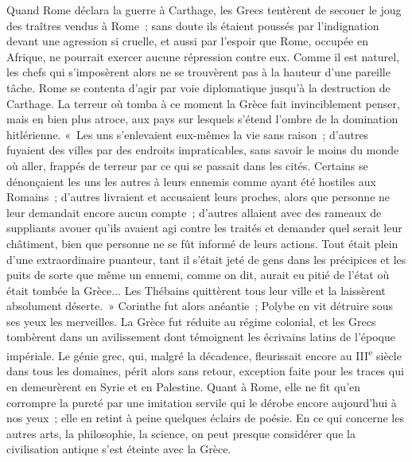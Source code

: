 \documentclass[french,twoside]{book} %
\begin{document}
Quand Rome déclara la guerre à Carthage, les Grecs tentèrent de secouer le joug des traîtres vendus à Rome ; sans doute ils étaient poussés par l'indi­gnation devant une agression si cruelle, et aussi par l'espoir que Rome, occupée en Afrique, ne pourrait exercer aucune répression contre eux. Comme il est naturel, les chefs qui s'imposèrent alors ne se trouvèrent pas à la hauteur d'une pareille tâche. Rome se contenta d'agir par voie diplomatique jusqu'à la destruction de Carthage. La terreur où tomba à ce moment la Grèce fait invinciblement penser, mais en bien plus atroce, aux pays sur lesquels s'étend l'ombre de la domination hitlérienne. « Les uns s'enlevaient eux-mêmes la vie sans raison ; d'autres fuyaient des villes par des endroits impraticables, sans savoir le moins du monde où aller, frappés de terreur par ce qui se passait dans les cités. Certains se dénonçaient les uns les autres à leurs ennemis comme ayant été hostiles aux Romains ; d'autres livraient et accusaient leurs proches, alors que personne ne leur demandait encore aucun compte ; d'autres allaient avec des rameaux de suppliants avouer qu'ils avaient agi contre les traités et demander quel serait leur châtiment, bien que personne ne se fût informé de leurs actions. Tout était plein d'une extraordinaire puanteur, tant il s'était jeté de gens dans les précipices et les puits de sorte que même un ennemi, comme on dit, aurait eu pitié de l'état où était tombée la Grèce... Les Thébains quittèrent tous leur ville et la laissèrent absolument déserte. » Corinthe fut alors anéantie ; Polybe en vit détruire sous ses yeux les merveilles. La Grèce fut réduite au régime colonial, et les Grecs tombèrent dans un avilissement dont témoignent les écrivains latins de l'époque impériale. Le génie grec, qui, malgré la décadence, fleurissait encore au III\textsuperscript{e} siècle dans tous les domaines, périt alors sans retour, exception faite pour les traces qui en demeurèrent en Syrie et en Palestine. Quant à Rome, elle ne fit qu'en corrompre la pureté par une imitation servile qui le dérobe encore aujourd'hui à nos yeux ; elle en retint à peine quelques éclairs de poésie. En ce qui concerne les autres arts, la philosophie, la science, on peut presque considérer que la civilisation antique s'est éteinte avec la Grèce.\par
\end{document}
